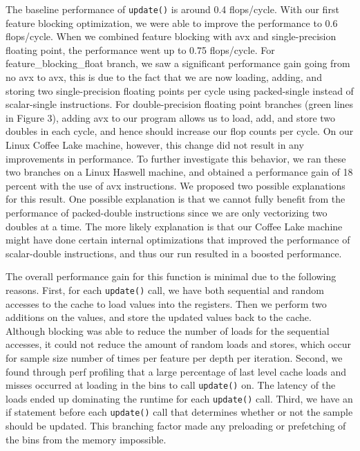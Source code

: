 The baseline performance of \texttt{update()} is around 0.4 flops/cycle. With our first feature blocking optimization, we were able to improve the performance to 0.6 flops/cycle. When we combined feature blocking with avx and single-precision floating point, the performance went up to 0.75 flops/cycle. For feature\_blocking\_float branch, we saw a significant performance gain going from no avx to avx, this is due to the fact that we are now loading, adding, and storing two single-precision floating points per cycle using packed-single instead of scalar-single instructions. For double-precision floating point branches (green lines in Figure 3), adding avx to our program allows us to load, add, and store two doubles in each cycle, and hence should increase our flop counts per cycle. On our Linux Coffee Lake machine, however, this change did not result in any improvements in performance. To further investigate this behavior, we ran these two branches on a Linux Haswell machine, and obtained a performance gain of 18 percent with the use of avx instructions. We proposed two possible explanations for this result. One possible explanation is that we cannot fully benefit from the performance of packed-double instructions since we are only vectorizing two doubles at a time. The more likely explanation is that our Coffee Lake machine might have done certain internal optimizations that improved the performance of scalar-double instructions, and thus our run resulted in a boosted performance.

The overall performance gain for this function is minimal due to the following reasons. First, for each \texttt{update()} call, we have both sequential and random accesses to the cache to load values into the registers. Then we perform two additions on the values, and store the updated values back to the cache. Although blocking was able to reduce the number of loads for the sequential accesses, it could not reduce the amount of random loads and stores, which occur for sample size number of times per feature per depth per iteration. Second, we found through perf profiling that a large percentage of last level cache loads and misses occurred at loading in the bins to call \texttt{update()} on. The latency of the loads ended up dominating the runtime for each \texttt{update()} call. Third, we have an if statement before each \texttt{update()} call that determines whether or not the sample should be updated. This branching factor made any preloading or prefetching of the bins from the memory impossible.

